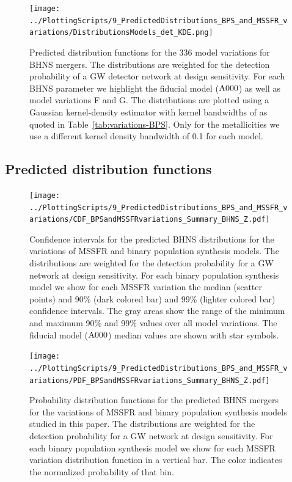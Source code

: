 \documentclass[twocolumn]{aastex63}
\newcommand\bhnsSingle{BHNS\xspace}
\newcommand{\mAzero}{\ensuremath{\rm{A}000}\xspace}
\newcommand{\Nmodels}{\ensuremath{336}\xspace}
\begin{document}
\begin{figure}
    \centering
%
\texttt{[image: ../PlottingScripts/9\_PredictedDistributions\_BPS\_and\_MSSFR\_variations/DistributionsModels\_det\_KDE.png]} %
%
    \caption{Predicted distribution functions for the \Nmodels model variations for \bhnsSingle mergers. The distributions are weighted for the detection probability of a \ac{GW} detector network at design sensitivity. For each \bhnsSingle parameter we highlight the fiducial model (\mAzero) as well as model variations F and G. The distributions are plotted using a Gaussian kernel-density estimator with kernel bandwidths of as quoted in Table~\ref{tab:variations-BPS}. Only for the metallicities we use a different kernel density bandwidth of 0.1 for each model. }  
    \label{fig:Distributions_BHNS_kde}
\end{figure}
%

\subsection{Predicted distribution functions}
%
%




\begin{figure}
    \centering
%
\texttt{[image: ../PlottingScripts/9\_PredictedDistributions\_BPS\_and\_MSSFR\_variations/CDF\_BPSandMSSFRvariations\_Summary\_BHNS\_Z.pdf]} %
%
    \caption{Confidence intervals for the predicted \bhnsSingle distributions for the variations of MSSFR and binary population synthesis models. 
    The distributions are weighted for the detection probability for a \ac{GW} network at design sensitivity. 
    For each binary population synthesis model we show for each \ac{MSSFR} variation the median (scatter points) and $90\%$ (dark colored bar) and $99\%$  (lighter colored bar) confidence intervals.  
    The gray areas show the range of the minimum and maximum 90$\%$ and 99$\%$ values over all model variations.
     The fiducial model (\mAzero) median values are shown with star symbols.   }
    \label{fig:ConfidenceINtervals_BHNS}
\end{figure}
%



\begin{figure}
    \centering
%
\texttt{[image: ../PlottingScripts/9\_PredictedDistributions\_BPS\_and\_MSSFR\_variations/PDF\_BPSandMSSFRvariations\_Summary\_BHNS\_Z.pdf]} %
%
    \caption{Probability distribution functions for the predicted \bhnsSingle mergers  for the variations of MSSFR and binary population synthesis models studied in this paper. 
    The distributions are weighted for the detection probability for a \ac{GW} network at design sensitivity. 
    For each binary population synthesis model we show for each \ac{MSSFR} variation distribution function in a vertical bar. The color indicates the normalized probability of that bin.  }
    \label{fig:PDF_BHNS}
\end{figure}
%
\end{document}

